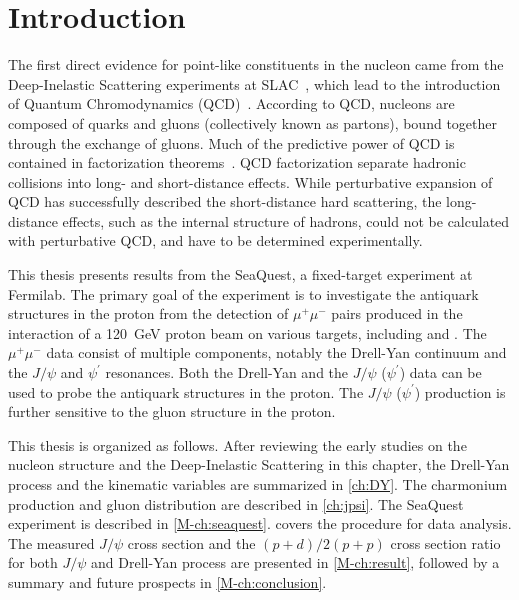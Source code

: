 \documentclass[../main.tex]{subfiles}
\begin{document}
\ifSubfilesClassLoaded{\mainmatter}{}

\chapter{Introduction}
\label{ch:intro}
The first direct evidence for point-like constituents in the nucleon came
from the Deep-Inelastic Scattering experiments at SLAC~\cite{breidenbach1969},
which lead to the introduction of Quantum Chromodynamics (QCD)~\cite{fritzsch1972,fritzsch1973}.
According to QCD, nucleons are composed of quarks and gluons (collectively known as partons),
bound together through the exchange of gluons. Much of the predictive power of QCD
is contained in factorization theorems~\cite{collins1989}. QCD factorization separate
hadronic collisions into long- and short-distance effects. While perturbative expansion
of QCD has successfully described the short-distance hard scattering, the long-distance
effects, such as the internal structure of hadrons,
could not be calculated with perturbative QCD, and have to be determined experimentally.

This thesis presents results from the SeaQuest, a fixed-target experiment at Fermilab.
The primary goal of the experiment is to investigate the antiquark structures
in the proton from the detection of $\mu^+\mu^-$ pairs produced in
the interaction of a \SI{120}{\GeV} proton beam on various targets, including  and .
The $\mu^+\mu^-$ data consist of multiple components, notably the Drell-Yan continuum
and the  $J/\psi$ and $\psi^\prime$ resonances.
Both the Drell-Yan and the $J/\psi$ ($\psi^\prime$) data can be used to probe
the antiquark structures in the proton.
The $J/\psi$ ($\psi^\prime$) production is further sensitive to the gluon structure in the proton.

This thesis is organized as follows. After reviewing the early studies
on the nucleon structure and the Deep-Inelastic Scattering in this chapter,
the Drell-Yan process and the kinematic variables are summarized in
\cref{ch:DY}. The charmonium production and gluon distribution are described
in \cref{ch:jpsi}. The SeaQuest experiment is described in \cref{M-ch:seaquest}.
 covers the procedure for data analysis. The measured $J/\psi$
cross section and the $(p+d)/2(p+p)$ cross section ratio for both $J/\psi$ and Drell-Yan process
are presented in \cref{M-ch:result}, followed by a summary and future prospects
in \cref{M-ch:conclusion}.
\end{document}
